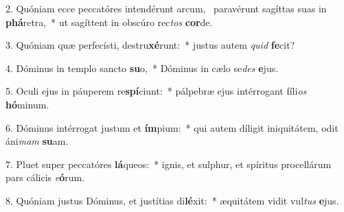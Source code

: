 2. Quóniam ecce peccatóres intendérunt arcum, \dag\  paravérunt sagíttas suas in \textbf{phá}retra,~*  ut sagíttent in obscúro rec\textit{tos} \textbf{cor}de.\

3. Quóniam quæ perfecísti, destru\textbf{xé}runt:~*  justus autem \textit{quid} \textbf{fe}cit?\

4. Dóminus in templo sancto \textbf{su}o,~*  Dóminus in cælo se\textit{des} \textbf{e}jus.\

5. Oculi ejus in páuperem re\textbf{spí}ciunt:~*  pálpebræ ejus intérrogant fíli\textit{os} \textbf{hó}minum.\

6. Dóminus intérrogat justum et \textbf{ím}pium:~*  qui autem díligit iniquitátem, odit áni\textit{mam} \textbf{su}am.\

7. Pluet super peccatóres \textbf{lá}queos:~*  ignis, et sulphur, et spíritus procellárum pars cálicis \textit{e}\textbf{ó}rum.\

8. Quóniam justus Dóminus, et justítias di\textbf{lé}xit:~*  æquitátem vidit vul\textit{tus} \textbf{e}jus.\

